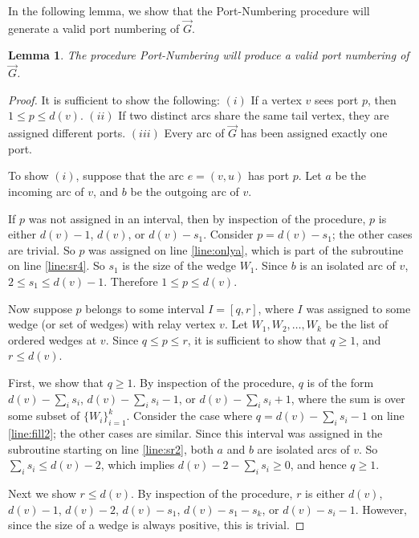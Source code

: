 \documentclass[12pt,letterpaper,oneside]{book}
\newtheorem{lemma}[theorem]{Lemma}
\begin{document}
In the following lemma, we show that the Port-Numbering procedure will generate a valid port numbering of $\vec{G}$.  


\begin{lemma}
The procedure Port-Numbering will produce a valid port numbering of $\vec{G}$.
\end{lemma}
\begin{proof}
It is sufficient to show the following:
\newline
$(i)$ If a vertex $v$ sees port $p$, then  $1\le p\le d(v)$. \newline
$(ii)$ If two distinct arcs share the same tail vertex, they are assigned different ports.\newline
$(iii)$ Every arc of $\vec{G}$ has been assigned exactly one port. 


To show $(i)$, suppose that the arc $e=(v,u)$ has port $p$.  Let $a$ be the incoming arc of 
$v$, and $b$ be the outgoing arc of $v$.  

If $p$ was not assigned in an interval, then 
by inspection of the procedure, 
$p$ is either $d(v)-1$, $d(v)$, or $d(v)-s_1$.  Consider $p=d(v)-s_1$; the other cases are trivial.  So 
$p$ was assigned on line \ref{line:onlya}, which is part of the subroutine on line \ref{line:sr4}.  So 
$s_1$ is the size of the wedge $W_1$.  Since $b$ is an isolated arc of $v$, $2\le s_1\le d(v)-1$.  Therefore 
$1\le p \le d(v)$.

Now suppose $p$ belongs to 
some interval $I=[q,r]$, where $I$ was assigned to some wedge (or set of wedges) with relay vertex $v$.  
Let $W_1,W_2,\ldots,W_k$ be the list of ordered wedges at $v$.  Since $q\le p\le r$, it is sufficient to 
show that $q\ge 1$, and $r\le d(v)$.  

First, we show that $q\ge 1$.  
By inspection of the procedure, $q$ is of the form 
$d(v)-\sum_is_i$, $d(v)-\sum_is_i-1$, or $d(v)-\sum_is_i+1$, where the 
sum is over some subset of $\{W_i\}_{i=1}^k$.  Consider the case where $q=d(v)-\sum_is_i-1$ on line \ref{line:fill2}; 
the other 
cases are similar.  Since this interval was assigned in the subroutine 
starting on line \ref{line:sr2}, both $a$ and $b$ are isolated arcs of $v$.  So $\sum_i s_i \le d(v)-2$, 
which implies $d(v)-2-\sum_is_i \ge 0$, and hence $q\ge 1$.

Next we show $r\le d(v)$.  By inspection of the procedure, 
$r$ is either $d(v)$, $d(v)-1$, $d(v)-2$, $d(v)-s_1$, $d(v)-s_1-s_k$, or $d(v)-s_i-1$.   However, since the size of a wedge 
is always positive, this is trivial.  


\end{proof}
\end{document}

